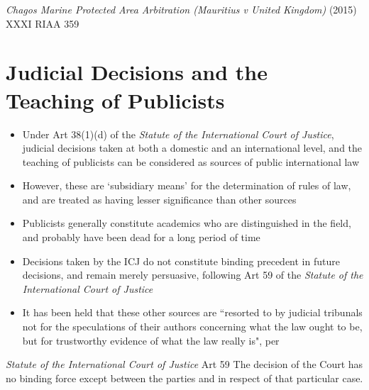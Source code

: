 \begin{casedetails}{\textit{Chagos Marine Protected Area Arbitration (Mauritius v United Kingdom)} (2015) XXXI RIAA 359}
\end{casedetails}

\section{Judicial Decisions and the Teaching of Publicists}
\begin{itemize}
    \item Under Art 38(1)(d) of the \textit{Statute of the International Court of Justice}, judicial decisions taken at both a domestic and an international level, and the teaching of publicists can be considered as sources of public international law
    \item However, these are `subsidiary means' for the determination of rules of law, and are treated as having lesser significance than other sources
    \item Publicists generally constitute academics who are distinguished in the field, and probably have been dead for a long period of time
    \item Decisions taken by the ICJ do not constitute binding precedent in future decisions, and remain merely persuasive, following Art 59 of the \textit{Statute of the International Court of Justice}
    \item It has been held that these other sources are ``resorted to by judicial tribunals not for the speculations of their authors concerning what the law ought to be, but for trustworthy evidence of what the law really is", per 
\end{itemize}
\begin{statutedetails}{\textit{Statute of the International Court of Justice} Art 59}
    \flushleft
    The decision of the Court has no binding force except between the parties and in respect of that particular case.
\end{statutedetails}

